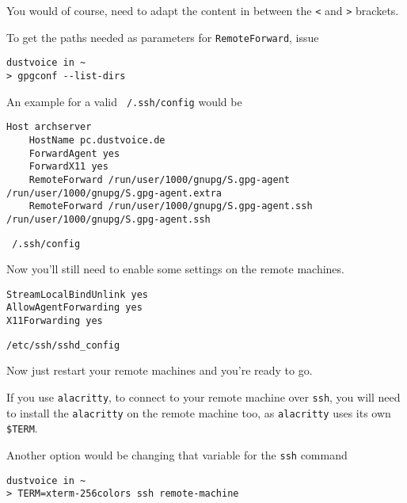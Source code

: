 \documentclass[10pt]{dustdoc}
\begin{document}
\begin{NOTE}
    You would of course, need to adapt the content in between the \texttt{<} and \texttt{>} brackets.

    To get the paths needed as parameters for \texttt{RemoteForward}, issue

    \begin{verbatim}
dustvoice in ~
> gpgconf --list-dirs
    \end{verbatim}

\end{NOTE}

\begin{example}
    An example for a valid \texttt{~/.ssh/config} would be

    \begin{mintedlisting}
        \begin{verbatim}
Host archserver
    HostName pc.dustvoice.de
    ForwardAgent yes
    ForwardX11 yes
    RemoteForward /run/user/1000/gnupg/S.gpg-agent /run/user/1000/gnupg/S.gpg-agent.extra
    RemoteForward /run/user/1000/gnupg/S.gpg-agent.ssh /run/user/1000/gnupg/S.gpg-agent.ssh
        \end{verbatim}


        \caption{\texttt{~/.ssh/config}}
    \end{mintedlisting}
\end{example}

Now you’ll still need to enable some settings on the remote machines.

\begin{mintedlisting}
    \begin{verbatim}
StreamLocalBindUnlink yes
AllowAgentForwarding yes
X11Forwarding yes
    \end{verbatim}

    \caption{\texttt{/etc/ssh/sshd\_config}}
\end{mintedlisting}

Now just restart your remote machines and you’re ready to go.

\begin{NOTE}
    If you use \texttt{alacritty}, to connect to your remote machine over \texttt{ssh}, you will need to install the \texttt{alacritty} on the remote machine too, as \texttt{alacritty} uses its own \texttt{\$TERM}.

    Another option would be changing that variable for the \texttt{ssh} command

    \begin{verbatim}
dustvoice in ~
> TERM=xterm-256colors ssh remote-machine
    \end{verbatim}

\end{NOTE}
\end{document}
